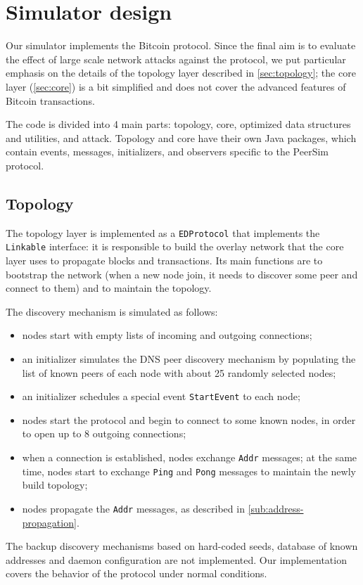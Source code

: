 \section{Simulator design}
Our simulator implements the Bitcoin protocol.
Since the final aim is to evaluate the effect of large scale network attacks against the protocol, we put particular emphasis on the details of the topology layer described in \cref{sec:topology};
the core layer (\cref{sec:core}) is a bit simplified and does not cover the advanced features of Bitcoin transactions.

\smallskip
The code is divided into \num{4} main parts: topology, core, optimized data structures and utilities, and attack.
Topology and core have their own Java packages, which contain events, messages, initializers, and observers specific to the PeerSim protocol.

\subsection{Topology}
The topology layer is implemented as a \texttt{EDProtocol} that implements the \texttt{Linkable} interface:
it is responsible to build the overlay network that the core layer uses to propagate blocks and transactions.
Its main functions are to bootstrap the network (when a new node join, it needs to discover some peer and connect to them) and to maintain the topology.

\medskip
\noindent
The discovery mechanism is simulated as follows:
\begin{itemize}
	\item nodes start with empty lists of incoming and outgoing connections;
	\item an initializer simulates the DNS peer discovery mechanism by populating the list of known peers of each node with about \num{25} randomly selected nodes;
	\item an initializer schedules a special event \texttt{StartEvent} to each node;
	\item nodes start the protocol and begin to connect to some known nodes, in order to open up to \num{8} outgoing connections;
	\item when a connection is established, nodes exchange \texttt{Addr} messages; at the same time, nodes start to exchange \texttt{Ping} and \texttt{Pong} messages to maintain the newly build topology;
	\item nodes propagate the \texttt{Addr} messages, as described in \cref{sub:address-propagation}.
\end{itemize}
The backup discovery mechanisms based on hard-coded seeds, database of known addresses and daemon configuration are not implemented.
Our implementation covers the behavior of the protocol under normal conditions.

